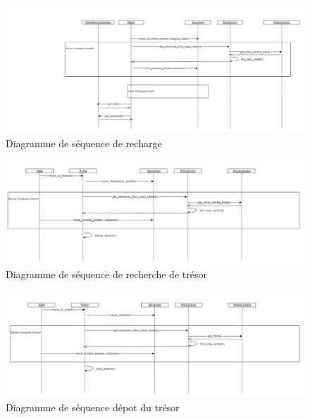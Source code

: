 \begin{landscape}
\begin{figure}
  \centering
  \includegraphics[scale=0.5, angle=0]{resources/diagrams/rechargeState.png}
  \caption{Diagramme de séquence de recharge}
\end{figure}

\begin{figure}
  \centering
  \includegraphics[scale=0.4, angle=0]{resources/diagrams/findTreasureState.png}
  \caption{Diagramme de séquence de recherche de trésor}
\end{figure}

\begin{figure}
  \centering
  \includegraphics[scale=0.5, angle=0]{resources/diagrams/depositState.png}
  \caption{Diagramme de séquence dépot du trésor}
\end{figure}
\end{landscape}

